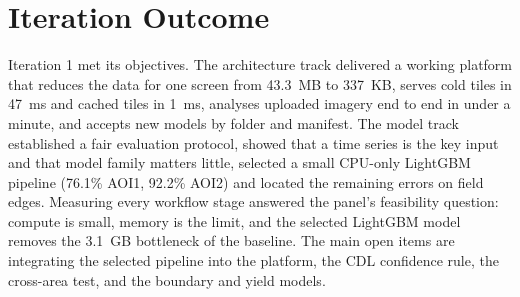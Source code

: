 \section{Iteration Outcome}
Iteration 1 met its objectives. The architecture track delivered a working platform that reduces the
data for one screen from 43.3~MB to 337~KB, serves cold tiles in 47~ms and cached tiles in 1~ms,
analyses uploaded imagery end to end in under a minute, and accepts new models by folder and
manifest. The model track established a fair evaluation protocol, showed that a time series is the
key input and that model family matters little, selected a small CPU-only LightGBM pipeline
(76.1\% AOI1, 92.2\% AOI2) and located the remaining errors on field edges. Measuring every workflow stage answered the panel's feasibility question: compute is small,
memory is the limit, and the selected LightGBM model removes the 3.1~GB bottleneck of the baseline.
The main open items are
integrating the selected pipeline into the platform, the CDL confidence rule, the cross-area test,
and the boundary and yield models.
